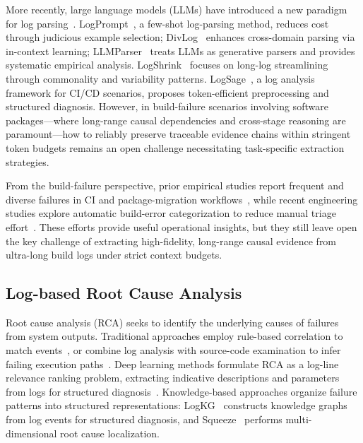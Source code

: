\documentclass[sigconf]{acmart}
\begin{document}
More recently, large language models (LLMs) have introduced a new paradigm for log parsing~\cite{achiam2023gpt}. LogPrompt~\cite{liu2024logprompt}, a few-shot log-parsing method, reduces cost through judicious example selection; DivLog~\cite{xu2024divlog} enhances cross-domain parsing via in-context learning; LLMParser~\cite{ma2024llmparser} treats LLMs as generative parsers and provides systematic empirical analysis. LogShrink~\cite{li2024logshrink} focuses on long-log streamlining through commonality and variability patterns. LogSage~\cite{xu2025logsage}, a log analysis framework for CI/CD scenarios, proposes token-efficient preprocessing and structured diagnosis. However, in build-failure scenarios involving software packages---where long-range causal dependencies and cross-stage reasoning are paramount---how to reliably preserve traceable evidence chains within stringent token budgets remains an open challenge necessitating task-specific extraction strategies.

From the build-failure perspective, prior empirical studies report frequent and diverse failures in CI and package-migration workflows~\cite{rausch2017empirical}, while recent engineering studies explore automatic build-error categorization to reduce manual triage effort~\cite{lee2024applying}. These efforts provide useful operational insights, but they still leave open the key challenge of extracting high-fidelity, long-range causal evidence from ultra-long build logs under strict context budgets.

\subsection{Log-based Root Cause Analysis}

Root cause analysis (RCA) seeks to identify the underlying causes of failures from system outputs. Traditional approaches employ rule-based correlation to match events~\cite{notaro2023logrule}, or combine log analysis with source-code examination to infer failing execution paths~\cite{yuan2010sherlog}. Deep learning methods formulate RCA as a log-line relevance ranking problem, extracting indicative descriptions and parameters from logs for structured diagnosis~\cite{wittkopp2024logrca}. Knowledge-based approaches organize failure patterns into structured representations: LogKG~\cite{sui2023logkg} constructs knowledge graphs from log events for structured diagnosis, and Squeeze~\cite{li2019generic} performs multi-dimensional root cause localization.
\end{document}
